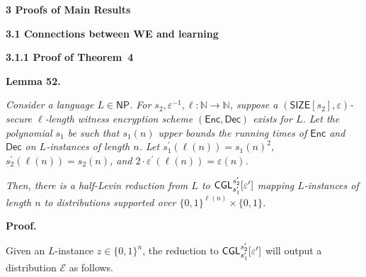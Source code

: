 \documentclass[10pt,a4paper]{article}
\begin{document}
\par\medskip\noindent\textbf{
3 Proofs of Main Results}\par




\par\medskip\noindent\textbf{
3.1 Connections between WE and learning}\par




\par\medskip\noindent\textbf{
3.1.1 Proof of Theorem 4
}\par





\par\medskip\noindent\textbf{
\textbf{Lemma 52}\textbf{.}
}\par



\emph{Consider a language $L\in{\mathsf{NP}}$. For $s_{2},\varepsilon^{-1},\ell:\mathbb{N}\to\mathbb{N}$, suppose a $({\mathsf{SIZE}}[s_{2}],\varepsilon)$-secure $\ell$-length witness encryption scheme $({\mathsf{Enc}},{\mathsf{Dec}})$ exists for $L$. Let the polynomial $s_{1}$ be such that $s_{1}(n)$ upper bounds the running times of ${\mathsf{Enc}}$ and ${\mathsf{Dec}}$ on $L$-instances of length $n$. Let $s^{\prime}_{1}(\ell(n))=s_{1}(n)^{2}$, $s^{\prime}_{2}(\ell(n))=s_{2}(n)$, and $2\cdot\varepsilon^{\prime}(\ell(n))=\varepsilon(n)$.}\par




\emph{Then, there is a half-Levin reduction from $L$ to ${\sf CGL}_{s_{1}^{\prime}}^{s_{2}^{\prime}}[\varepsilon^{\prime}]$ mapping $L$-instances of length $n$ to distributions supported over $\{0,1\}^{\ell(n)}\times\{0,1\}$.}\par






\par\medskip\noindent\textbf{Proof.}\par




Given an $L$-instance $z\in\{0,1\}^{n}$, the reduction to ${\sf CGL}_{s_{1}^{\prime}}^{s_{2}^{\prime}}[\varepsilon^{\prime}]$ will output a distribution $\mathcal{E}$ as follows.\par
\end{document}
